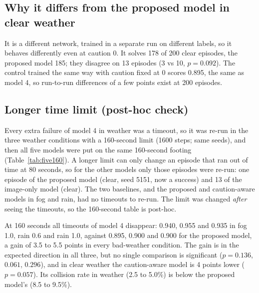 \documentclass[11pt,a4paper]{article}
\begin{document}
\subsection{Why it differs from the proposed model in clear weather}
It is a different network, trained in a separate run on different labels, so it behaves differently even at caution 0. It solves 178 of 200 clear episodes, the proposed model 185; they disagree on 13 episodes (3 vs 10, $p=0.092$). The control trained the same way with caution fixed at 0 scores 0.895, the same as model 4, so run-to-run differences of a few points exist at 200 episodes.
\subsection{Longer time limit (post-hoc check)}\label{sec:longer}
Every extra failure of model 4 in weather was a timeout, so it was re-run in the three weather conditions with a 160-second limit (1600 steps; same seeds), and then all five models were put on the same 160-second footing (Table~\ref{tab:five160}). A longer limit can only change an episode that ran out of time at 80 seconds, so for the other models only those episodes were re-run: one episode of the proposed model (clear, seed 5151, now a success) and 13 of the image-only model (clear). The two baselines, and the proposed and caution-aware models in fog and rain, had no timeouts to re-run. The limit was changed \emph{after} seeing the timeouts, so the 160-second table is post-hoc.
\begin{table}[H]\centering\scriptsize
\caption{All five models with the 160-second limit (1600 steps). 200 episodes each, seeds 5000 to 5199, sparse traffic. Eleven image-only episodes in clear weather still time out at 160 seconds; there are no other timeouts.}\label{tab:five160}
\resizebox{\textwidth}{!}{}
\end{table}
\begin{table}[H]\centering\scriptsize
\caption{Caution-aware model at 80 and 160 seconds, next to the proposed model at 80 seconds. 200 episodes each.}\label{tab:longer}
\resizebox{\textwidth}{!}{}
\end{table}
\begin{table}[H]\centering\scriptsize
\caption{Paired tests at 160 seconds. First rows: caution-aware against proposed. Second rows: a control run in which the caution input is forced to 1 in every weather, including clear, against the caution-aware model (post-hoc control, results in the folder sparse\_always\_cautious).}\label{tab:longerpaired}
\resizebox{\textwidth}{!}{}
\end{table}
At 160 seconds all timeouts of model 4 disappear: 0.940, 0.955 and 0.935 in fog 1.0, rain 0.6 and rain 1.0, against 0.895, 0.900 and 0.900 for the proposed model, a gain of 3.5 to 5.5 points in every bad-weather condition. The gain is in the expected direction in all three, but no single comparison is significant ($p=0.136$, $0.061$, $0.296$), and in clear weather the caution-aware model is 4 points lower ($p=0.057$). Its collision rate in weather (2.5 to 5.0\%) is below the proposed model's (8.5 to 9.5\%).
\end{document}
